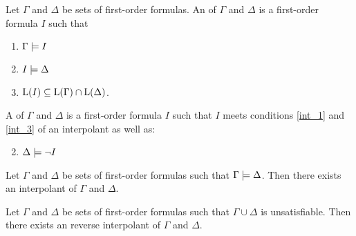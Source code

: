 \begin{defi}
	\label{def:interpolant}
	Let $\Gamma$ and $\Delta$ be sets of first-order formulas.
	An  of $\Gamma$ and $\Delta$ is a first-order formula $I$ such that 
	\begin{enumerate}
		\item $ \Gamma \models I$ \label{int_1}
		\item $ I \models \Delta $  \label{int_2}
		\item $ \operatorname{L}(I) \subseteq \operatorname{L}(\Gamma) \cap \operatorname{L}(\Delta)$.  \label{int_3}
	\end{enumerate}

	\begin{samepage}
		A  of $\Gamma$ and $\Delta$ is a first-order formula $I$ such that $I$ meets conditions \ref{int_1} and \ref{int_3} of an interpolant as well as:
		\begin{enumerate}[\quad\:1'.]
				\setcounter{enumi}{1}
			\item $ \Delta \models \lnot I $  \label{int_2prime}
				\qedhere
		\end{enumerate}
	\end{samepage}
\end{defi}

\begin{thm}[Interpolation]
	\label{thm:interpolation_original}
	Let $\Gamma$ and $\Delta$ be sets of first-order formulas such that $ \Gamma \models \Delta $.
	Then there exists an interpolant of $\Gamma$ and $\Delta$.
\end{thm}

\begin{thm}
	\label{thm:interpolation}
	Let $\Gamma$ and $\Delta$ be sets of first-order formulas such that $ \Gamma \cup \Delta $ is unsatisfiable.
	Then there exists an reverse interpolant of $\Gamma$ and $\Delta$.
\end{thm}


